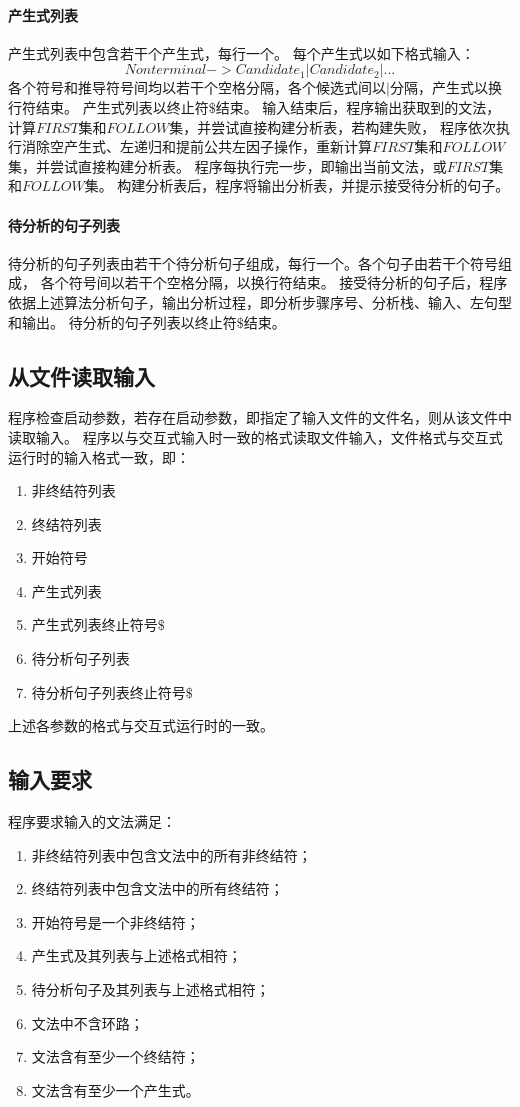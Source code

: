 \documentclass[UTF8]{ctexart}
\begin{document}
\paragraph{产生式列表}
产生式列表中包含若干个产生式，每行一个。
每个产生式以如下格式输入：
$$ Nonterminal -> Candidate_1 | Candidate_2 | ... $$
各个符号和推导符号间均以若干个空格分隔，各个候选式间以$|$分隔，产生式以换行符结束。
产生式列表以终止符$\$$结束。
输入结束后，程序输出获取到的文法，计算$FIRST$集和$FOLLOW$集，并尝试直接构建分析表，若构建失败，
程序依次执行消除空产生式、左递归和提前公共左因子操作，重新计算$FIRST$集和$FOLLOW$集，并尝试直接构建分析表。
程序每执行完一步，即输出当前文法，或$FIRST$集和$FOLLOW$集。
构建分析表后，程序将输出分析表，并提示接受待分析的句子。
\paragraph{待分析的句子列表}
待分析的句子列表由若干个待分析句子组成，每行一个。各个句子由若干个符号组成，
各个符号间以若干个空格分隔，以换行符结束。
接受待分析的句子后，程序依据上述算法分析句子，输出分析过程，即分析步骤序号、分析栈、输入、左句型和输出。
待分析的句子列表以终止符$\$$结束。
\subsection{从文件读取输入}
程序检查启动参数，若存在启动参数，即指定了输入文件的文件名，则从该文件中读取输入。
程序以与交互式输入时一致的格式读取文件输入，文件格式与交互式运行时的输入格式一致，即：
\begin{enumerate}
	\item 非终结符列表
	\item 终结符列表
	\item 开始符号
	\item 产生式列表
	\item 产生式列表终止符号$\$$
	\item 待分析句子列表
	\item 待分析句子列表终止符号$\$$
\end{enumerate}
上述各参数的格式与交互式运行时的一致。
\subsection{输入要求}
程序要求输入的文法满足：
\begin{enumerate}
	\item 非终结符列表中包含文法中的所有非终结符；
	\item 终结符列表中包含文法中的所有终结符；
	\item 开始符号是一个非终结符；
	\item 产生式及其列表与上述格式相符；
	\item 待分析句子及其列表与上述格式相符；
	\item 文法中不含环路；
	\item 文法含有至少一个终结符；
	\item 文法含有至少一个产生式。
\end{enumerate}
\end{document}
